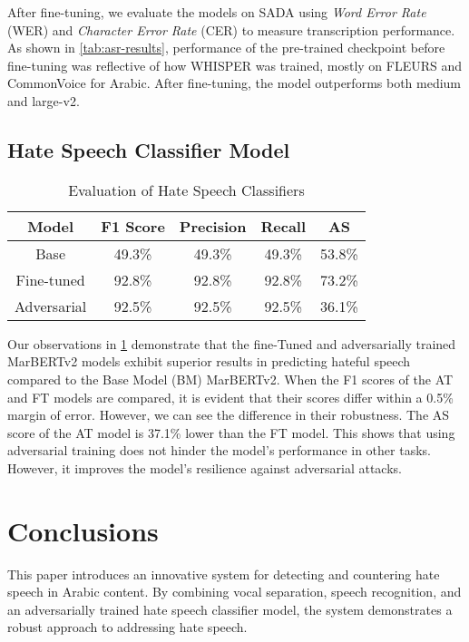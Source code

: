 \documentclass[10pt,twocolumn,letterpaper]{article}
\begin{document}
After fine-tuning, we evaluate the models on SADA using \emph{Word Error Rate} (WER) and \emph{Character Error Rate} (CER) to measure transcription performance.
As shown in \cref{tab:asr-results}, performance of the pre-trained checkpoint before fine-tuning was reflective of how WHISPER was trained, mostly on FLEURS and CommonVoice for Arabic.
After fine-tuning, the model outperforms both medium and large-v2.


\subsection{Hate Speech Classifier Model}

\begin{table}[h]
    \centering
    \begin{tabular}{ccccc}
        \toprule
        Model & F1 Score & Precision & Recall & AS \\
        \midrule 
        Base & 49.3\% & 49.3\% & 49.3\% & 53.8\% \\
        Fine-tuned & 92.8\% & 92.8\%& 92.8\%& 73.2\%\\
        Adversarial & 92.5\% & 92.5\%& 92.5\%& 36.1\%\\
        \bottomrule
    \end{tabular}
    \caption{Evaluation of Hate Speech Classifiers}
    \label{tab:hs-eval}
\end{table}

 Our observations in \cref{tab:hs-eval} demonstrate that the fine-Tuned and adversarially trained MarBERTv2 models exhibit superior results in predicting hateful speech compared to the Base Model (BM) MarBERTv2. When the F1 scores of the AT and FT models are compared, it is evident that their scores differ within a 0.5\% margin of error. However, we can see the difference in their robustness. The AS score of the AT model is 37.1\% lower than the FT model. This shows that using adversarial training does not hinder the model's performance in other tasks. However, it improves the model's resilience against adversarial attacks.


\section{Conclusions}

This paper introduces an innovative system for detecting and countering hate speech in Arabic content. By combining vocal separation, speech recognition, and an adversarially trained hate speech classifier model, the system demonstrates a robust approach to addressing hate speech.
\end{document}
